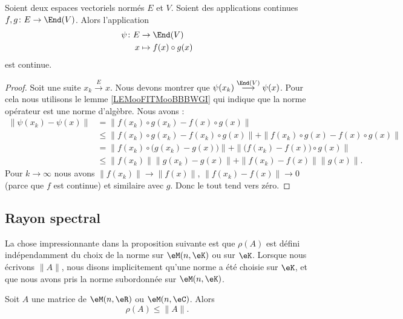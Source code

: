 \begin{proposition}     \label{PROPooJGNFooEwtNmJ}
	Soient deux espaces vectoriels normés \( E\) et \( V\). Soient des applications continues \( f,g\colon E\to \End(V)\). Alors l'application
	\begin{equation}
		\begin{aligned}
			\psi\colon E & \to \End(V)            \\
			x            & \mapsto f(x)\circ g(x)
		\end{aligned}
	\end{equation}
	est continue.
\end{proposition}

\begin{proof}
	Soit une suite \( x_k\stackrel{E}{\longrightarrow}x\). Nous devons montrer que \( \psi(x_k)\stackrel{\End(V)}{\longrightarrow}\psi(x)\). Pour cela nous utilisons le lemme \ref{LEMooFITMooBBBWGI} qui indique que la norme opérateur est une norme d'algèbre. Nous avons :
	\begin{subequations}
		\begin{align}
			\| \psi(x_k)-\psi(x) \| & =\| f(x_k)\circ g(x_k)-f(x)\circ g(x) \|                                             \\
			                        & \leq \| f(x_k)\circ g(x_k)-f(x_k)\circ g(x) \|+\| f(x_k)\circ g(x)-f(x)\circ g(x) \| \\
			                        & =\| f(x_k)\circ \big( g(x_k)-g(x) \big) \|+\| \big(f(x_k)-f(x)\big)\circ g(x) \|     \\
			                        & \leq \| f(x_k) \|\| g(x_k)-g(x) \|+\| f(x_k)-f(x) \|\| g(x) \|.
		\end{align}
	\end{subequations}
	Pour \( k\to \infty\) nous avons \( \| f(x_k) \| \to \| f(x) \| \), \( \| f(x_k)-f(x) \|\to 0\) (parce que \( f\) est continue) et similaire avec \( g\). Donc le tout tend vers zéro.
\end{proof}

\subsection{Rayon spectral}

La chose impressionnante dans la proposition suivante est que \( \rho(A)\) est défini indépendamment du choix de la norme sur \( \eM(n,\eK)\) ou sur \( \eK\). Lorsque nous écrivons \( \| A \|\), nous disons implicitement qu'une norme a été choisie sur \( \eK\), et que nous avons pris la norme subordonnée sur \( \eM(n,\eK)\).
\begin{proposition}        \label{PROPooWZJBooTPLSZp}
	Soit \( A\) une matrice de \( \eM(n,\eR)\) ou \( \eM(n,\eC)\). Alors
	\begin{equation}
		\rho(A)\leq \| A \|.
	\end{equation}
\end{proposition}

